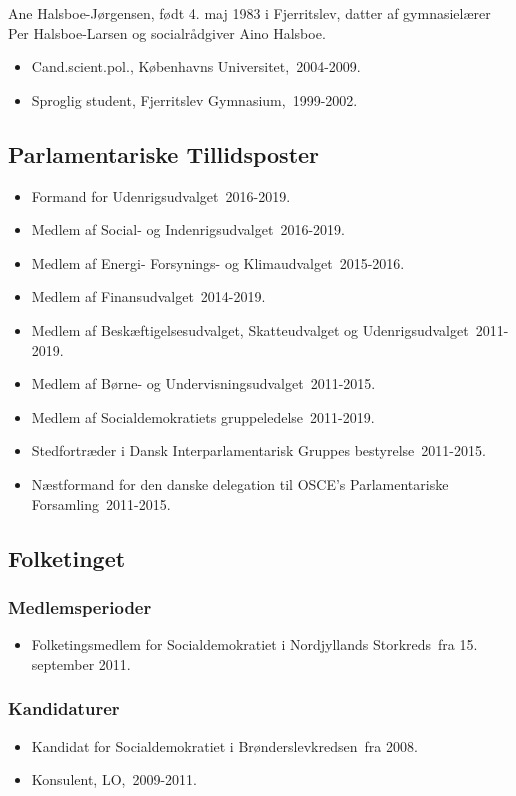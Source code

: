 \documentclass[11pt, a4paper]{awesome-cv}
\begin{document}
\makecvheader[R]
\makelettertitle
\begin{cvletter}
Ane Halsboe-Jørgensen, født 4. maj 1983 i Fjerritslev, datter af gymnasielærer Per Halsboe-Larsen og socialrådgiver Aino Halsboe.

\begin{itemize}
\item Cand.scient.pol., Københavns Universitet, 2004-2009.
\item Sproglig student, Fjerritslev Gymnasium, 1999-2002.
\end{itemize}
\subsection*{Parlamentariske Tillidsposter}
\begin{itemize}
\item Formand for Udenrigsudvalget 2016-2019.
\item Medlem af Social- og Indenrigsudvalget 2016-2019.
\item Medlem af Energi- Forsynings- og Klimaudvalget 2015-2016.
\item Medlem af Finansudvalget 2014-2019.
\item Medlem af Beskæftigelsesudvalget, Skatteudvalget og Udenrigsudvalget 2011-2019.
\item Medlem af Børne- og Undervisningsudvalget 2011-2015.
\item Medlem af Socialdemokratiets gruppeledelse 2011-2019.
\item Stedfortræder i Dansk Interparlamentarisk Gruppes bestyrelse 2011-2015.
\item Næstformand for den danske delegation til OSCE’s Parlamentariske Forsamling 2011-2015.
\end{itemize}
\subsection*{Folketinget}
\subsubsection*{Medlemsperioder}
\begin{itemize}
\item Folketingsmedlem for Socialdemokratiet i Nordjyllands Storkreds fra 15. september 2011.
\end{itemize}
\subsubsection*{Kandidaturer}
\begin{itemize}
\item Kandidat for Socialdemokratiet i Brønderslevkredsen fra 2008.
\end{itemize}
\begin{itemize}
\item Konsulent, LO, 2009-2011.
\end{itemize}
\end{cvletter}
\end{document}
